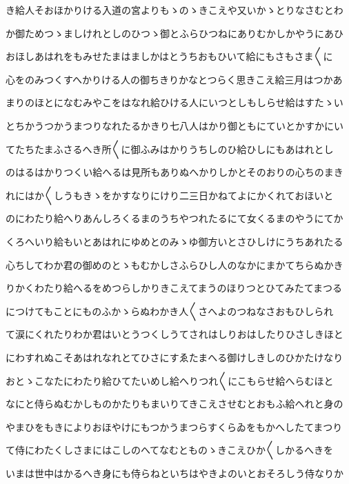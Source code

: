 \documentclass[a4paper,11pt,landscape]{ltjtarticle}
\begin{document}
\par\medskip
き給人そおほかりける入道の宮よりもゝのゝきこえや又いかゝとりなさむとわ
\par\medskip
か御ためつゝましけれとしのひつゝ御とふらひつねにありむかしかやうにあひ
\par\medskip
おほしあはれをもみせたまはましかはとうちおもひいて給にもさもさま〱に
\par\medskip
心をのみつくすへかりける人の御ちきりかなとつらく思きこえ給三月はつかあ
\par\medskip
まりのほとになむみやこをはなれ給ひける人にいつとしもしらせ給はすたゝい
\par\medskip
とちかうつかうまつりなれたるかきり七八人はかり御ともにていとかすかにい
\par\medskip
てたちたまふさるへき所〱に御ふみはかりうちしのひ給ひしにもあはれとし
\par\medskip
のはるはかりつくい給へるは見所もありぬへかりしかとそのおりの心ちのまき
\par\medskip
れにはか〱しうもきゝをかすなりにけり二三日かねてよにかくれておほいと
\par\medskip
のにわたり給へりあんしろくるまのうちやつれたるにて女くるまのやうにてか
\par\medskip
くろへいり給もいとあはれにゆめとのみゝゆ御方いとさひしけにうちあれたる
\par\medskip
心ちしてわか君の御めのとゝもむかしさふらひし人のなかにまかてちらぬかき
\par\medskip
りかくわたり給へるをめつらしかりきこえてまうのほりつとひてみたてまつる
\par\medskip
につけてもことにものふかゝらぬわかき人〱さへよのつねなさおもひしられ
\par\medskip
て涙にくれたりわか君はいとうつくしうてされはしりおはしたりひさしきほと
\par\medskip
にわすれぬこそあはれなれとてひさにすゑたまへる御けしきしのひかたけなり
\par\medskip
おとゝこなたにわたり給ひてたいめし給へりつれ〱にこもらせ給へらむほと
\par\medskip
なにと侍らぬむかしものかたりもまいりてきこえさせむとおもふ給へれと身の
\par\medskip
やまひをもきによりおほやけにもつかうまつらすくらゐをもかへしたてまつり
\par\medskip
て侍にわたくしさまにはこしのへてなむとものゝきこえひか〱しかるへきを
\par\medskip
いまは世中はかるへき身にも侍らねといちはやきよのいとおそろしう侍なりか
\par\medskip
\end{document}
